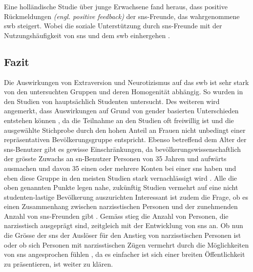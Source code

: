 Eine holländische Studie über junge Erwachsene fand heraus, dass positive Rückmeldungen \textit{(engl. positive feedback)} der \gls{sns}-Freunde, das wahrgenommene \gls{swb} steigert. Wobei die soziale Unterstützung durch \gls{sns}-Freunde mit der Nutzungshäufigkeit von \gls{sns} und dem \gls{swb} einhergehen \cite{Valkenburg:2006}. 

\subsection{Fazit}\label{subsec.traitsFazit}
Die Auswirkungen von Extraversion und Neurotizismus auf das \gls{swb} ist sehr stark von den untersuchten Gruppen und deren Homogenität abhängig. So wurden in den Studien von  hauptsächlich Studenten untersucht. Des weiteren wird angemerkt, dass Auswirkungen auf Grund von gender basierten Unterschieden entstehen können \cite{Special:2012}, da die Teilnahme an den Studien oft freiwillig ist und die ausgewählte Stichprobe durch den hohen Anteil an Frauen \cite{Manago:2012} nicht unbedingt einer repräsentativen Bevölkerungsgruppe entspricht. Ebenso betreffend dem Alter der \gls{sns}-Benutzer gibt es gewisse Einschränkungen, da bevölkerungswissenschaftlich der grösste Zuwachs an \gls{sn}-Benutzer Personen von 35 Jahren und aufwärts ausmachen \cite{Lenhart:2009} und davon 35\text{\%}  einen oder mehrere Konten bei einer \gls{sns} haben und eben diese Gruppe in den meisten Studien stark vernachlässigt wird \cite{Special:2012}. Alle die oben genannten Punkte legen nahe, zukünftig Studien vermehrt auf eine nicht studenten-lastige Bevölkerung auszurichten \cite{Kim:2011} \newline
Interessant ist zudem die Frage, ob es einen Zusammenhang zwischen narzisstischen Personen und der zunehmenden Anzahl von \gls{sns}-Freunden gibt \cite{Manago:2012}. Gemäss  stieg die Anzahl von Personen, die narzisstisch ausgeprägt sind, zeitgleich mit der Entwicklung von \gls{sns} an. Ob nun die Grösse der \gls{sns} der Auslöser für den Anstieg von narzisstischen Personen ist \cite{Manago:2012} oder ob sich Personen mit narzisstischen Zügen vermehrt durch die Möglichkeiten von \gls{sns} angesprochen fühlen \cite{Carpenter:2012}, da es einfacher ist sich einer breiten Öffentlichkeit zu präsentieren, ist weiter zu klären. 








